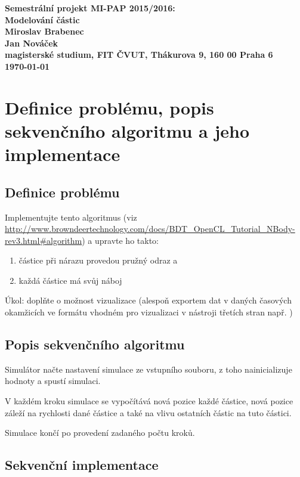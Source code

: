 \documentclass[12pt]{article}
\begin{document}
\begin{center}
\bf Semestrální projekt MI-PAP 2015/2016:\\[5mm]
    Modelování částic\\[5mm]
       Miroslav Brabenec\\
       Jan Nováček\\[2mm]
magisterské studium, FIT ČVUT, Thákurova 9, 160 00 Praha 6\\[2mm]
\today
\end{center}
%
%
%
%
%
\section{Definice problému, popis sekvenčního algoritmu a jeho implementace}

\subsection{Definice problému}
Implementujte tento algoritmus (viz \url{http://www.browndeertechnology.com/docs/BDT_OpenCL_Tutorial_NBody-rev3.html#algorithm}) a upravte ho takto:

\begin{enumerate}
\item	částice při nárazu provedou pružný odraz a
\item	každá částice má svůj náboj
\end{enumerate}

Úkol: doplňte o možnost vizualizace (alespoň exportem dat v daných časových okamžicích ve formátu vhodném pro vizualizaci v nástroji třetích stran např. ) 

\subsection{Popis sekvenčního algoritmu}
Simulátor načte nastavení simulace ze vstupního souboru, z toho nainicializuje hodnoty a spustí simulaci.

V každém kroku simulace se vypočítává nová pozice každé částice, nová pozice záleží na rychlosti dané částice a také na vlivu ostatních částic na tuto částici.

Simulace končí po provedení zadaného počtu kroků.

\subsection{Sekvenční implementace}
\end{document}
